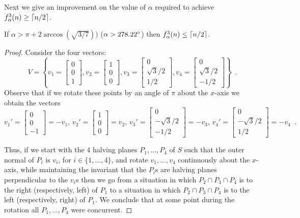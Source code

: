\documentclass[lotsofwhite]{patmorin}
\begin{document}
Next we give an improvement on the value of $\alpha$ required to
achieve $f_\alpha^3(n)\ge\left\lceil n/2 \right\rceil$.
 
\begin{lem}
If $\alpha > \pi+2\arccos(\sqrt{3/7}))$ ($\alpha>278.22^\circ$) then $f^3_\alpha(n) \le \left\lceil n/2 \right\rceil$.
\end{lem}

\begin{proof}
Consider the four vectors: 
\[
   V=\left\{v_1=\left[\begin{array}{c} 0 \\ 0 \\ 1 \end{array}\right] ,
   v_2=\left[\begin{array}{c} 1 \\ 0 \\ 0 \end{array}\right] ,
   v_3=\left[\begin{array}{c} 0 \\ \sqrt{3}/2 \\ 1/2 \end{array}\right] ,
   v_4=\left[\begin{array}{c} 0 \\ \sqrt{3}/2 \\ -1/2 \end{array}\right] 
  \right\}
  \enspace .
\]
Observe that if we rotate these points by an angle of $\pi$ about the
$x$-axis we obtain the vectors 
\[
   v_1'=\left[\begin{array}{c} 0 \\ 0 \\ -1 \end{array}\right] = -v_1,\,
   v_2'=\left[\begin{array}{c} 1 \\ 0 \\ 0 \end{array}\right] = v_2,\,
   v_3'=\left[\begin{array}{c} 0 \\ -\sqrt{3}/2 \\ -1/2
\end{array}\right] = -v_3,\,
   v_4'=\left[\begin{array}{c} 0 \\ -\sqrt{3}/2 \\ 1/2
\end{array}\right] = -v_4 \enspace .
\]

Thus, if we start with the 4 halving planes $P_1,\ldots,P_4$ of $S$
such that the outer normal of $P_i$ is $v_i$, for
$i\in\{1,\ldots,4\}$, and rotate $v_1,\ldots,v_4$ continuously about the
$x$-axis, while maintaining the invariant that the $P_i$s are halving
planes perpendicular to the $v_i$s then we go from a situation in
which $P_2\cap P_3\cap P_4$ is to the right (respectively, left) of
$P_1$ to a situation in which $P_2\cap P_3\cap P_4$ is to the left
(respectively, right) of $P_1$.  We conclude that at some point during
the rotation all $P_1,\ldots,P_4$ were concurrent.


\end{proof}
\end{document}
